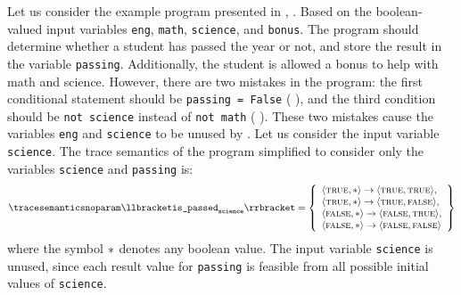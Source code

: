 \begin{example}
Let us consider the example program presented in \textcite{Urban2018}, \cf{} .
Based on the boolean-valued input variables \texttt{eng}, \texttt{math}, \texttt{science}, and \texttt{bonus}.
The program should determine whether a student has passed the year or not, and store the result in the variable \texttt{passing}. Additionally, the student is allowed a bonus to help with math and science.
However, there are two mistakes in the program: the first conditional statement should be \texttt{passing = False} (\cf{} ), and the third condition should be \texttt{not science} instead of \texttt{not math} (\cf{} ).
These two mistakes cause the variables \texttt{eng} and \texttt{science} to be unused by .
Let us consider the input variable \texttt{science}.
The trace semantics of the program simplified to consider only the variables \texttt{science} and \texttt{passing} is:
\begin{align*}
  \tracesemanticsnoparam\semanticsof{\texttt{is\_passed}_\texttt{science}}
  =
  \left\{
    \begin{array}{l}
      \tuple\true\anyvalue\rightarrow\tuple\true\true, \\
      \tuple\true\anyvalue\rightarrow\tuple\true\false, \\
      \tuple\false\anyvalue\rightarrow\tuple\false\true, \\
      \tuple\false\anyvalue\rightarrow\tuple\false\false
    \end{array}
  \right\}
\end{align*}
where the symbol ${*}$ denotes any boolean value.
The input variable \texttt{science} is unused, since each result value for \texttt{passing} is feasible from all possible initial values of \texttt{science}.


\end{example}
